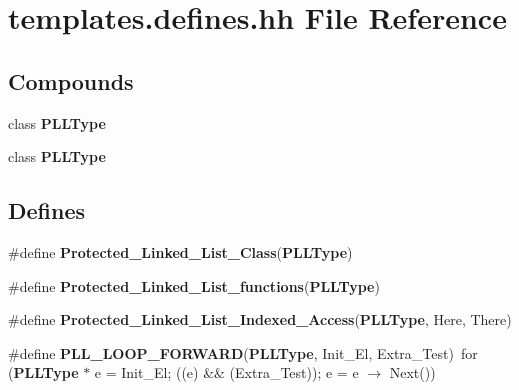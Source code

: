 \section{templates.defines.hh File Reference}
\label{templates_8defines_8hh}
\subsection*{Compounds}
\begin{CompactItemize}
\item 
class {\bf PLLType}
\item 
class {\bf PLLType}
\end{CompactItemize}
\subsection*{Defines}
\begin{CompactItemize}
\item 
\#define {\bf Protected\_\-Linked\_\-List\_\-Class}({\bf PLLType})
\item 
\#define {\bf Protected\_\-Linked\_\-List\_\-functions}({\bf PLLType})
\item 
\#define {\bf Protected\_\-Linked\_\-List\_\-Indexed\_\-Access}({\bf PLLType}, Here, There)
\item 
\#define {\bf PLL\_\-LOOP\_\-FORWARD}({\bf PLLType}, Init\_\-El, Extra\_\-Test)\ for ({\bf PLLType} $\ast$ e = Init\_\-El; ((e) \&\& (Extra\_\-Test)); e = e $\rightarrow$ Next())
\end{CompactItemize}

